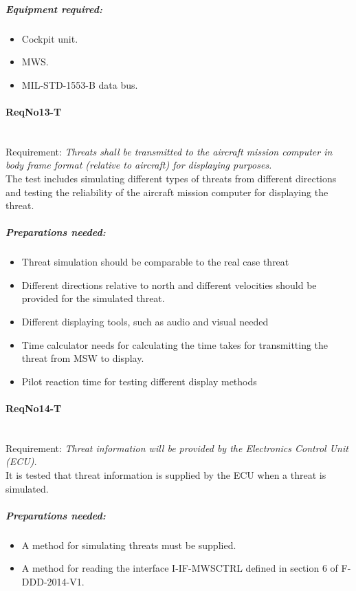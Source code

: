 	\subparagraph{Equipment required:}
	\begin{itemize}
	\item Cockpit unit.
	\item MWS.
	\item MIL-STD-1553-B data bus.
	\end{itemize}

\paragraph{ReqNo13-T}\mbox{}\\ %
Requirement: \textit{Threats shall be transmitted to the aircraft mission computer in body frame format (relative to aircraft) for displaying purposes.}\\
The test includes simulating different types of threats from different directions and testing the reliability of the aircraft mission computer for displaying the threat.
	\subparagraph{Preparations needed:}
	\begin{itemize}
	\item Threat simulation should be comparable to the real case threat
	\item Different directions relative to north and different velocities should be provided for the simulated threat.
	\item Different displaying tools, such as audio and visual needed
	\item Time calculator needs for calculating the time takes for transmitting the threat from MSW to display.
	\item Pilot reaction time for testing different display methods
	\end{itemize}

\paragraph{ReqNo14-T}\mbox{}\\ %
Requirement: \textit{Threat information will be provided by the Electronics Control Unit (ECU).}
\\
It is tested that threat information is supplied by the ECU when a threat is simulated.

	\subparagraph{Preparations needed:}
	\begin{itemize}
	\item A method for simulating threats must be supplied.
	\item A method for reading the interface I-IF-MWSCTRL defined in section 6 of F-DDD-2014-V1.
	\end{itemize} 


